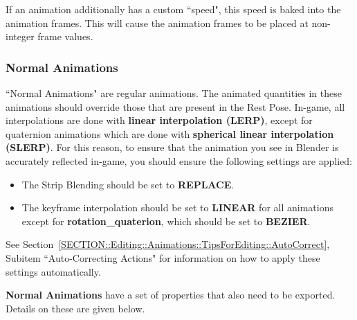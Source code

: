 \documentclass{article}
\begin{document}
If an animation additionally has a custom ``speed", this speed is baked into the animation frames. This will cause the animation frames to be placed at non-integer frame values.

\subsubsection{Normal Animations}
\label{SECTION::Edits::Animations::NormalAnimations}
``Normal Animations" are regular animations. The animated quantities in these animations should override those that are present in the Rest Pose. In-game, all interpolations are done with \textbf{linear interpolation (LERP)}, except for quaternion animations which are done with \textbf{spherical linear interpolation (SLERP)}. For this reason, to ensure that the animation you see in Blender is accurately reflected in-game, you should ensure the following settings are applied:
\begin{itemize}
\item The Strip Blending should be set to \textbf{REPLACE}.
\item The keyframe interpolation should be set to \textbf{LINEAR} for all animations except for \textbf{rotation\_quaterion}, which should be set to \textbf{BEZIER}.
\end{itemize}
See Section~\ref{SECTION::Editing::Animations::TipsForEditing::AutoCorrect}, Subitem ``Auto-Correcting Actions" for information on how to apply these settings automatically.

\textbf{Normal Animations} have a set of properties that also need to be exported. Details on these are given below.
\end{document}
